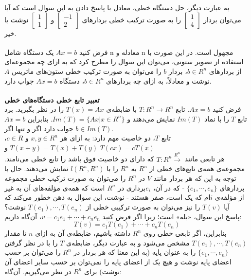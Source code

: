 به عبارت دیگر، حل دستگاه خطی، معادل با پاسخ دادن به این سوال است که آیا می‌توان بردار  $\begin{bmatrix}
1\\
4
\end{bmatrix}$ 	 را به صورت ترکیب خطی بردار‌های 	$\begin{bmatrix}
-1\\
2
\end{bmatrix}$ 	و 	$\begin{bmatrix}
1\\
1
\end{bmatrix}$ 	 نوشت یا خیر.\\\\
فرض کنید $Ax = b$ یک دستگاه شامل n معادله و n مجهول است. در این صورت با استفاده از تصویر ستونی، می‌توان این سوال را مطرح کرد که به ازای چه مجموعه‌ای از بردار‌های $b\in R^n$،  بردار $b$ را می‌توان به صورت ترکیب خطی ستون‌های ماتریس $A$ نوشت و معادلاً، به ازای چه بردار‌های $b\in R^n$، دستگاه $Ax=b$ جواب دارد.\\\\
\textbf{تعبیر تابع خطی دستگاه‌های خطی}\\
فرض کنید $Ax=b$. تابع $T: R^n \xrightarrow{} R^n$ با ضابطه‌ی $T(x) = Ax$ را در نظر بگیرید. برد تابع $T$ را با نماد $Im(T)$ نمایش می‌دهند و $Im(T) = \{Ax | x \in R^n\}$. بنابراین $Ax=b$ جواب دارد اگر و تنها اگر $b \in Im(T)$.\\
تابع $T$، دو خاصیت مهم دارد: به ازای هر $x,y \in R^n$ و $c \in R$، $T(x+y) = T(x)+T(y)$ و $T(cx) = cT(x)$\\
هر تابعی مانند $T:R^n \xrightarrow{ R^n}$ که دارای دو خاصیت فوق باشد را تابع خطی می‌نامند. مجموعه‌ی همه‌ی تابع‌های خطی از $R^n$ به $R^n$ را با $l(R^n,R^n)$ نمایش می‌دهند. حال با توجه به این که هر بردار مانند $V$ در $R^n$ را می‌توان به صورت ترکیب خطی مجموعه بردار‌های $\{e_{1},\cdots,e_{n}\}$ - که در آن، $e_{i}$برداری در $R^{n}$ است که همه‌ی مؤلفه‌های آن به غیر از مؤلفه‌ی $i$ام که یک است، صفر‌ هستند - نوشت، این سوال به ذهن خطور می‌کند که آیا $T(v)$ را نیز می‌توان به صورت ترکیبی خطی از $T(e_{1}),\cdots,T(e_{n})$ نوشت؟\\
پاسخ این سوال، «بله» است؛ زیرا اگر فرض کنید $v = c_{1}e_{1} + \cdots + c_{n}e_{n}$، آن‌گاه داریم:
$$T(v) = c_{1}T(e_{1})+\cdots+c_{n}T(e_{n})$$ بنابراین، اگر تابعی خطی روی $R^n$ داشته باشیم، ضابطه‌ی آن به ازای $n$ تا مقدار $T(e_{1}), \cdots, T(e_{n})$ مشخص می‌شود و به عبارت دیگر، ضابطه‌ی $T$ را با در نظر گرفتن $\{e_{1},\cdots,e_{n}\}$ را به عنوان پایه (به این معنا که هر بردار در $R^n$ را می‌توان بر حسب اعضا‌ی پایه نوشت و هیچ یک از اعضا‌ی پایه را نمی‌توان بر حسب سایر اعضا‌ی آن نوشت) برای $R^n$ در نظر می‌گیریم. آن‌گاه:\\
